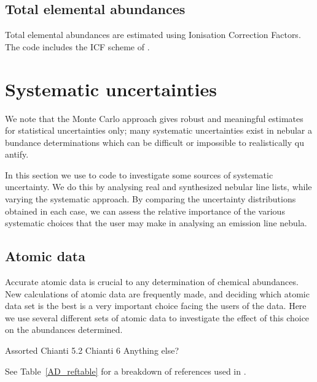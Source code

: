\documentclass[useAMS,usenatbib]{mn2e}
\begin{document}
\subsection{Total elemental abundances}

Total elemental abundances are estimated using Ionisation Correction Factors.  The code includes the ICF scheme of \citet{1994MNRAS.271..257K}.

\section{Systematic uncertainties}

We note that the Monte Carlo approach gives robust and meaningful estimates for
statistical uncertainties only; many systematic uncertainties exist in nebular a
bundance determinations which can be difficult or impossible to realistically qu
antify.

In this section we use to code to investigate some sources of systematic uncertainty.  We do this by analysing real and synthesized nebular line lists, while varying the systematic approach.  By comparing the uncertainty distributions obtained in each case, we can assess the relative importance of the various systematic choices that the user may make in analysing an emission line nebula.

\subsection{Atomic data}

Accurate atomic data is crucial to any determination of chemical abundances.  New calculations of atomic data are frequently made, and deciding which atomic data set is the best is a very important choice facing the users of the data.  Here we use several different sets of atomic data to investigate the effect of this choice on the abundances determined.

Assorted
Chianti 5.2
Chianti 6
Anything else?

See Table~\ref{AD_reftable} for a breakdown of references used in \citet{2011arXiv1108.3800S}.
\end{document}
